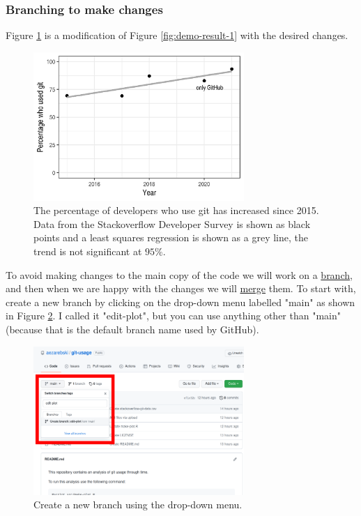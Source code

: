 \documentclass[11pt,onecolumn]{scrartcl}
\begin{document}
\subsubsection*{Branching to make changes}
\label{sec:orga1fb63c}

Figure \ref{fig:demo-result-2} is a modification of Figure \ref{fig:demo-result-1} with the
desired changes.

\begin{figure}[htbp]
\centering
\includegraphics[width=8cm]{./git-usage-2.png}
\caption{\label{fig:demo-result-2}The percentage of developers who use git has increased since 2015. Data from the Stackoverflow Developer Survey is shown as black points and a least squares regression is shown as a grey line, the trend is not significant at \(95\%\).}
\end{figure}

To avoid making changes to the main copy of the code we will work on a \hyperref[sec:org7358905]{branch},
and then when we are happy with the changes we will \hyperref[sec:org03d5d05]{merge} them. To start with,
create a new branch by clicking on the drop-down menu labelled "main" as shown
in Figure \ref{fig:create-new-branch}. I called it "edit-plot", but you can use
anything other than "main" (because that is the default branch name used by
GitHub).

\begin{figure}[htbp]
\centering
\includegraphics[width=8cm]{./create-new-branch.png}
\caption{\label{fig:create-new-branch}Create a new branch using the drop-down menu.}
\end{figure}
\end{document}
